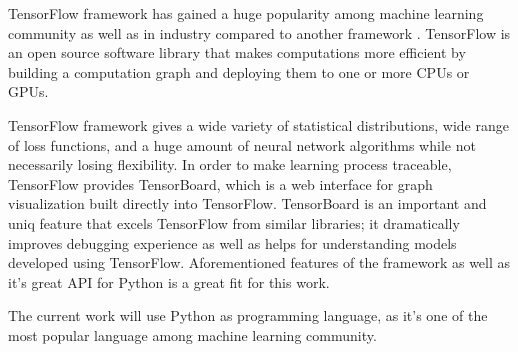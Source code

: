 TensorFlow framework has gained a huge popularity among machine learning
community as well as in industry compared to another framework \cite{Goldsborough}.
TensorFlow is an open source software library that makes computations more
efficient by building a computation graph and deploying them to one or more
CPUs or GPUs.


TensorFlow framework gives a wide variety of statistical distributions, wide
range of loss functions, and a huge amount of neural network algorithms while
not necessarily losing  flexibility. In order to make learning process traceable,
TensorFlow provides TensorBoard, which is a web interface for graph visualization
built directly into TensorFlow.
TensorBoard is an important and uniq feature that excels TensorFlow from similar
libraries; it dramatically improves debugging experience as well as helps
for understanding models developed using TensorFlow.
Aforementioned features of the framework as well
as it's great API for Python is a great fit for this work.

The current work will use Python as programming language, as it's one of
the most popular language among machine learning community.


